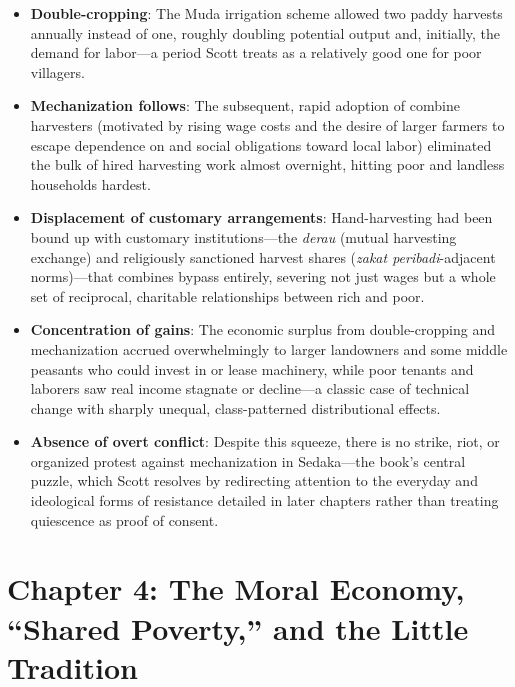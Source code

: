 \documentclass[12pt]{article}
\begin{document}
\begin{itemize}[leftmargin=*, itemsep=4pt]
    \item \textbf{Double-cropping}: The Muda irrigation scheme allowed two paddy harvests annually instead of one, roughly doubling potential output and, initially, the demand for labor---a period Scott treats as a relatively good one for poor villagers.
    \item \textbf{Mechanization follows}: The subsequent, rapid adoption of combine harvesters (motivated by rising wage costs and the desire of larger farmers to escape dependence on and social obligations toward local labor) eliminated the bulk of hired harvesting work almost overnight, hitting poor and landless households hardest.
    \item \textbf{Displacement of customary arrangements}: Hand-harvesting had been bound up with customary institutions---the \textit{derau} (mutual harvesting exchange) and religiously sanctioned harvest shares (\textit{zakat peribadi}-adjacent norms)---that combines bypass entirely, severing not just wages but a whole set of reciprocal, charitable relationships between rich and poor.
    \item \textbf{Concentration of gains}: The economic surplus from double-cropping and mechanization accrued overwhelmingly to larger landowners and some middle peasants who could invest in or lease machinery, while poor tenants and laborers saw real income stagnate or decline---a classic case of technical change with sharply unequal, class-patterned distributional effects.
    \item \textbf{Absence of overt conflict}: Despite this squeeze, there is no strike, riot, or organized protest against mechanization in Sedaka---the book's central puzzle, which Scott resolves by redirecting attention to the everyday and ideological forms of resistance detailed in later chapters rather than treating quiescence as proof of consent.
\end{itemize}

\section{Chapter 4: The Moral Economy, ``Shared Poverty,'' and the Little Tradition}
\end{document}
